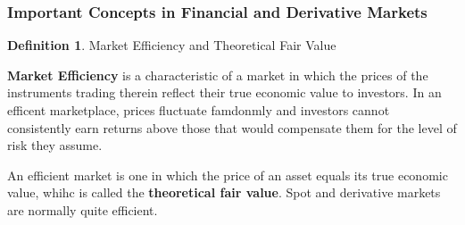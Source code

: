 \documentclass{book}
\theoremstyle{definition}
\newtheorem{definition}{Definition}[section]
\theoremstyle{remark}
\begin{document}
\subsubsection{Important Concepts in Financial and Derivative Markets}
    \begin{definition}{Market Efficiency and Theoretical Fair Value}
        
        \textbf{Market Efficiency} is a characteristic of a market in which the prices of the instruments trading therein reflect their true economic value to investors. In an efficent marketplace, prices fluctuate famdonmly and investors cannot consistently earn returns above those that would compensate them for the level of risk they assume.
        
        An efficient market is one in which the price of an asset equals its true economic value, whihc is called the \textbf{theoretical fair value}. Spot and derivative markets are normally quite efficient. 
    \end{definition}
    
\end{document}

